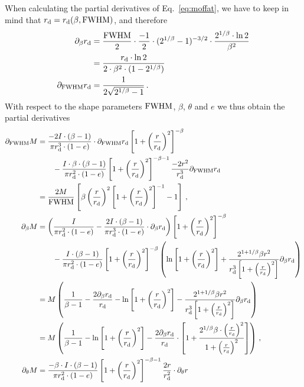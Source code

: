 When calculating the partial derivatives of Eq.~\ref{eq:moffat}, we have to keep in mind that $r_\text{d} = r_\text{d}(\beta,\text{FWHM})$, and therefore
%
\begin{align}
\partial_\beta r_\text{d} &= \frac{\text{FWHM}}{2} \cdot \frac{-1}{2} \cdot (2^{1/\beta}-1)^{-3/2} \cdot \frac{2^{1/\beta}\cdot \ln 2}{\beta^2} \nonumber\\
 &= \frac{r_\text{d}\cdot\ln 2}{2\cdot\beta^2\cdot(1-2^{1/\beta})} \\
\partial_{\text{FWHM}} r_\text{d} &= \frac{1}{2\sqrt{2^{1/\beta}-1}}\,.
\end{align}
%
With respect to the shape parameters $\text{FWHM}$, $\beta$, $\theta$ and $e$ we thus obtain the partial derivatives
%
\begin{align}
 \partial_\fwhm M &= \frac{-2I\cdot(\beta-1)}{\pi\rd^3\cdot(1-e)}\cdot \partial_\fwhm \rd \left[1+\left(\frac{r}{\rd}\right)^2\right]^{-\beta} \nonumber \\
 &\qquad - \frac{I\cdot\beta\cdot(\beta-1)}{\pi\rd^2\cdot(1-e)}\left[1+\left(\frac{r}{\rd}\right)^2\right]^{-\beta-1}\frac{-2r^2}{\rd^3} \partial_\fwhm \rd \nonumber \\
 &= \frac{2M}{\fwhm} \left[\beta\left(\frac{r}{\rd}\right)^2\left[1+\left(\frac{r}{\rd}\right)^2\right]^{-1}-1\right]\,,\\
%
 \partial_\beta M &= \left(\frac{I}{\pi \rd^2\cdot(1-e)} - \frac{2I\cdot(\beta-1)}{\pi\rd^3\cdot(1-e)}\cdot \partial_\beta \rd\right) \left[1+\left(\frac{r}{\rd}\right)^2\right]^{-\beta} \nonumber\\
 &\qquad - \frac{I\cdot(\beta-1)}{\pi \rd^2\cdot(1-e)}\left[1+\left(\frac{r}{\rd}\right)^2\right]^{-\beta}\left( \ln\left[1+\left(\frac{r}{\rd}\right)^2\right] +\frac{2^{1+1/\beta}\beta r^2}{\rd^3 \left[1+\left(\frac{r}{\rd}\right)^2\right]}\partial_\beta \rd \right) \nonumber \\
 &= M \left(\frac{1}{\beta-1} - \frac{2\partial_\beta\rd}{\rd} - \ln\left[1+\left(\frac{r}{\rd}\right)^2\right] - \frac{2^{1+1/\beta}\beta r^2}{\rd^3 \left[1+\left(\frac{r}{\rd}\right)^2\right]}\partial_\beta \rd \right)\nonumber\\
 &= M \left(\frac{1}{\beta-1} - \ln\left[1+\left(\frac{r}{\rd}\right)^2\right] - \frac{2\partial_\beta\rd}{\rd}\cdot\left[ 1 + \frac{2^{1/\beta}\beta\cdot\left(\frac{r}{\rd}\right)^2}{1+\left(\frac{r}{\rd}\right)^2}\right]\right)\,,\\
 \partial_\theta M &= \frac{-\beta\cdot I\cdot(\beta-1)}{\pi \rd^2\cdot(1-e)}\left[1+\left(\frac{r}{\rd}\right)^2\right]^{-\beta-1}\frac{2r}{\rd^2}\cdot\partial_\theta r \nonumber \\

\end{align}
